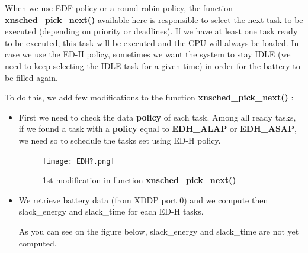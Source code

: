 \documentclass[12pt,hidelinks]{article}
\begin{document}
{	When we use EDF policy or a round-robin policy, the function \textbf{xnsched\_pick\_next()} available \href{https://github.com/skyultime/Xenomai-EDH/blob/final_version/kernel/cobalt/sched.c}{here} is responsible to select the next task to be executed (depending on priority or deadlines). If we have at least one task ready to be executed, this task will  be executed and the CPU will always be loaded. In case we use the ED-H policy, sometimes we want the system to stay IDLE (we need to keep selecting the IDLE task for a given time) in order for the battery to be filled again.\newline
	
	To do this, we add few modifications to the function \textbf{xnsched\_pick\_next()} :
	
	\begin{itemize}
	    \item First we need to check the data \textbf{policy} of each task. Among all ready tasks, if we found a task with a \textbf{policy} equal to \textbf{EDH\_ALAP} or \textbf{EDH\_ASAP}, we need so to schedule the tasks set using ED-H policy. 
	    
	    \begin{figure}[ht]
        \centering
    	\texttt{[image: EDH?.png]}
    	\caption{1st modification in function \textbf{xnsched\_pick\_next()}}
    	\end{figure} \newline
	    
	    \newpage \item We retrieve battery data (from XDDP port 0) and we compute then slack\_energy and slack\_time for each ED-H tasks.
	    
	    As you can see on the figure below, slack\_energy and slack\_time are not yet computed.
	    

\end{itemize}}
\end{document}

